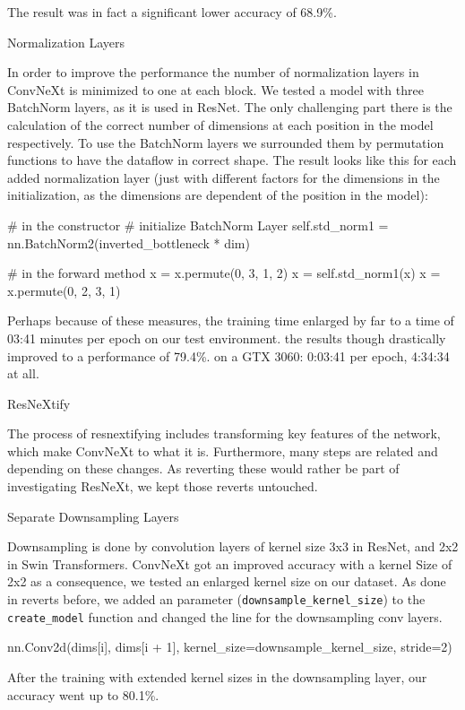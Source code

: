 \documentclass{article}
\begin{document}
The result was in fact a significant lower accuracy of 68.9\%.

Normalization Layers

In order to improve the performance the number of normalization layers in ConvNeXt is minimized to one at each block.
We tested a model with three BatchNorm layers, as it is used in ResNet.
The only challenging part there is the calculation of the correct number of dimensions at each position in the model respectively.
To use the BatchNorm layers we surrounded them by permutation functions to have the dataflow in correct shape.
The result looks like this for each added normalization layer (just with different factors for the dimensions in the initialization, as the dimensions are dependent of the position in the model):

\begin{python}
    # in the constructor
    # initialize BatchNorm Layer
    self.std_norm1 = nn.BatchNorm2(inverted_bottleneck * dim)

    # in the forward method
    x = x.permute(0, 3, 1, 2)
    x = self.std_norm1(x)
    x = x.permute(0, 2, 3, 1)
\end{python}


Perhaps because of these measures, the training time enlarged by far to a time of 03:41 minutes per epoch on our test environment.
the results though drastically improved to a performance of 79.4\%.
on a GTX 3060: 0:03:41 per epoch, 4:34:34 at all.

ResNeXtify

The process of resnextifying includes transforming key features of the network, which make ConvNeXt to what it is.
Furthermore, many steps are related and depending on these changes.
As reverting these would rather be part of investigating ResNeXt, we kept those reverts untouched.

Separate Downsampling Layers

Downsampling is done by convolution layers of kernel size 3x3 in ResNet, and 2x2 in Swin Transformers.
ConvNeXt got an improved accuracy with a kernel Size of 2x2 as a consequence, we tested an enlarged kernel size on our dataset.
As done in reverts before, we added an parameter (\texttt{downsample\_kernel\_size}) to the \texttt{create\_model} function and changed the line for the downsampling conv layers.

\begin{python}
    nn.Conv2d(dims[i], dims[i + 1],
    kernel_size=downsample_kernel_size, stride=2)
\end{python}
After the training with extended kernel sizes in the downsampling layer, our accuracy went up to 80.1\%.
\end{document}
